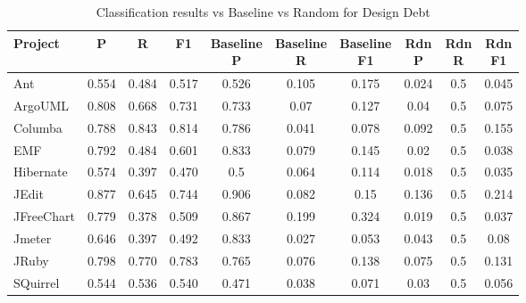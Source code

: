 \appendix{}
\label{sec:appendix}


\begin{table}[!hbt]
    \begin{center}
        \caption{Classification results vs Baseline vs Random for Design Debt}
        \label{tbl:classifier_results_vs_baseline_design}
        \begin{tabular}{l| c c c c c c c c c}
        \toprule
        \textbf{Project} & \textbf{P} & \textbf{R} & \textbf{F1} & \thead{Baseline\\P} & \thead{Baseline\\R} & \thead{Baseline\\F1} & \thead{Rdn\\P} & \thead{Rdn\\R} & \thead{Rdn\\F1} \\
        \midrule
        Ant           &    0.554 &  0.484 & 0.517 & 0.526 & 0.105 &  0.175 &  0.024 &  0.5 &  0.045  \\
        ArgoUML       &    0.808 &  0.668 & 0.731 & 0.733 &  0.07 &  0.127 &   0.04 &  0.5 &  0.075  \\
        Columba       &    0.788 &  0.843 & 0.814 & 0.786 & 0.041 &  0.078 &  0.092 &  0.5 &  0.155  \\
        EMF           &    0.792 &  0.484 & 0.601 & 0.833 & 0.079 &  0.145 &   0.02 &  0.5 &  0.038  \\
        Hibernate     &    0.574 &  0.397 & 0.470 &   0.5 & 0.064 &  0.114 &  0.018 &  0.5 &  0.035  \\
        JEdit         &    0.877 &  0.645 & 0.744 & 0.906 & 0.082 &   0.15 &  0.136 &  0.5 &  0.214  \\
        JFreeChart    &    0.779 &  0.378 & 0.509 & 0.867 & 0.199 &  0.324 &  0.019 &  0.5 &  0.037  \\
        Jmeter        &    0.646 &  0.397 & 0.492 & 0.833 & 0.027 &  0.053 &  0.043 &  0.5 &   0.08  \\
        JRuby         &    0.798 &  0.770 & 0.783 & 0.765 & 0.076 &  0.138 &  0.075 &  0.5 &  0.131  \\
        SQuirrel      &    0.544 &  0.536 & 0.540 & 0.471 & 0.038 &  0.071 &   0.03 &  0.5 &  0.056  \\
        \bottomrule
        \end{tabular}
    \end{center}    
\end{table}
                 

